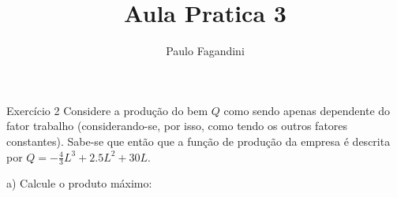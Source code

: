 \documentclass[]{beamer}
\title[Pratica 3]{Aula Pratica 3}
\author[P. Fagandini]{Paulo Fagandini}
\institute[ISCAL-IPL]{Lisbon Accounting and Business School}
\date{}
\begin{document}
\maketitle

\begin{frame}{Exerc\'icio 2}
    Considere a produ\c c\~ao do bem $Q$ como sendo apenas dependente do fator trabalho (considerando-se, por isso, como tendo os outros fatores constantes).
    Sabe-se que ent\~ao que a fun\c c\~ao de produ\c c\~ao da empresa \'e descrita por $Q=-\frac{4}{3}L^3+2.5L^2+30L$.
\end{frame}

\begin{frame}
    a) Calcule o produto m\'aximo:
    
    \vspace{0.2in}

    \\
\end{frame}
\end{document}
